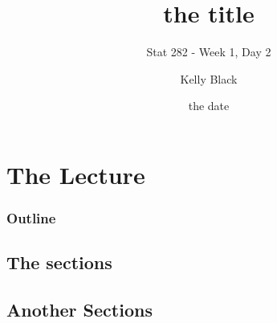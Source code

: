 
\section{The Lecture}

\title{the title}
\subtitle{Stat 282 - Week 1, Day 2}

\author{Kelly Black}
\date{the date}

\begin{frame}
  \titlepage
\end{frame}

\begin{frame}
  \frametitle{Outline}
  \tableofcontents[hideothersubsections,sectionstyle=show/hide]
\end{frame}


\subsection{The sections}


\begin{frame}
  \frametitle{}


\end{frame}




\subsection{Another Sections}

\begin{frame}
  \frametitle{}



\end{frame}


\begin{frame}
  \frametitle{}

  \begin{definition}
    
  \end{definition}

\end{frame}


